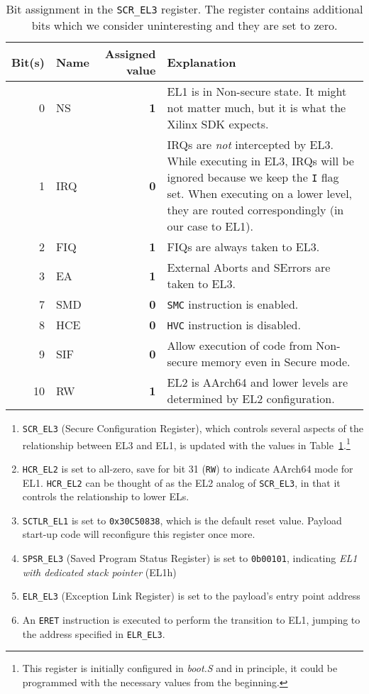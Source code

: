 \begin{table}[h]
  \centering
  \begin{tabular}{rlrp{9cm}}\toprule
  \textbf{Bit(s)} & \textbf{Name} & \textbf{Assigned value} & \textbf{Explanation}\\\midrule
    0 & NS & \textbf{1} & EL1 is in Non-secure state. It might not matter much, but it is what the Xilinx SDK expects. \\
    1 & IRQ & \textbf{0} & IRQs are \textit{not} intercepted by EL3. While executing in EL3, IRQs will be ignored because we keep the \texttt{I} flag set. When executing on a lower level, they are routed correspondingly (in our case to EL1). \\
    2 & FIQ & \textbf{1} & FIQs are always taken to EL3. \\
    3 & EA & \textbf{1} & External Aborts and SErrors are taken to EL3. \\
    7 & SMD & \textbf{0} & \texttt{SMC} instruction is enabled. \\
    8 & HCE & \textbf{0} & \texttt{HVC} instruction is disabled. \\
    9 & SIF & \textbf{0} & Allow execution of code from Non-secure memory even in Secure mode. \\
    10 & RW & \textbf{1} & EL2 is AArch64 and lower levels are determined by EL2 configuration. \\\bottomrule
  \end{tabular}

  \caption{Bit assignment in the \texttt{SCR\_EL3} register. The register contains additional bits which we consider uninteresting and they are set to zero.}
  \label{tab:scr-el3}
\end{table}

\begin{enumerate}
    \item \texttt{SCR\_EL3} (Secure Configuration Register), which controls several aspects of the relationship between EL3 and EL1, is updated with the values in Table~\ref{tab:scr-el3}.\footnote{This register is initially configured in \textit{boot.S} and in principle, it could be programmed with the necessary values from the beginning.}
    \item \texttt{HCR\_EL2} is set to all-zero, save for bit 31 (\texttt{RW}) to indicate AArch64 mode for EL1. \texttt{HCR\_EL2} can be thought of as the EL2 analog of \texttt{SCR\_EL3}, in that it controls the relationship to lower ELs.
    \item \texttt{SCTLR\_EL1} is set to \texttt{0x30C50838}, which is the default reset value. Payload start-up code will reconfigure this register once more.
    \item \texttt{SPSR\_EL3} (Saved Program Status Register) is set to \texttt{0b00101}, indicating \textit{EL1 with dedicated stack pointer} (EL1h)
    \item \texttt{ELR\_EL3} (Exception Link Register) is set to the payload's entry point address
    \item An \texttt{ERET} instruction is executed to perform the transition to EL1, jumping to the address specified in \texttt{ELR\_EL3}.
\end{enumerate}

